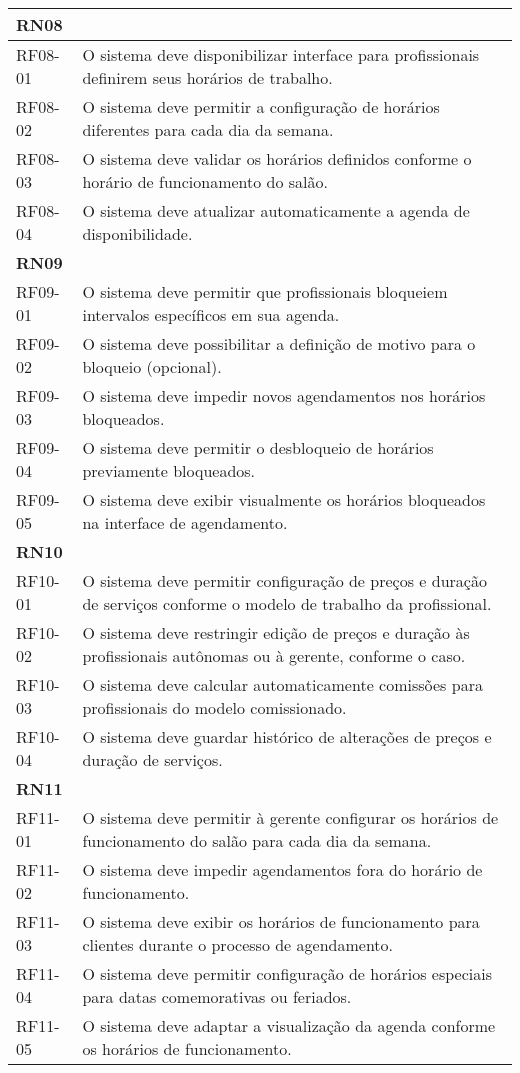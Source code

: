 \begin{longtable}{|p{}|p{}|}
	\multicolumn{2}{|l|}{\textbf{RN08}} \\ \hline
	RF08-01 & O sistema deve disponibilizar interface para profissionais definirem seus horários de trabalho. \\ \hline
	RF08-02 & O sistema deve permitir a configuração de horários diferentes para cada dia da semana. \\ \hline
	RF08-03 & O sistema deve validar os horários definidos conforme o horário de funcionamento do salão. \\ \hline
	RF08-04 & O sistema deve atualizar automaticamente a agenda de disponibilidade. \\ \hline
	
	\multicolumn{2}{|l|}{\textbf{RN09}} \\ \hline
	RF09-01 & O sistema deve permitir que profissionais bloqueiem intervalos específicos em sua agenda. \\ \hline
	RF09-02 & O sistema deve possibilitar a definição de motivo para o bloqueio (opcional). \\ \hline
	RF09-03 & O sistema deve impedir novos agendamentos nos horários bloqueados. \\ \hline
	RF09-04 & O sistema deve permitir o desbloqueio de horários previamente bloqueados. \\ \hline
	RF09-05 & O sistema deve exibir visualmente os horários bloqueados na interface de agendamento. \\ \hline
	
	\multicolumn{2}{|l|}{\textbf{RN10}} \\ \hline
	RF10-01 & O sistema deve permitir configuração de preços e duração de serviços conforme o modelo de trabalho da profissional. \\ \hline
	RF10-02 & O sistema deve restringir edição de preços e duração às profissionais autônomas ou à gerente, conforme o caso. \\ \hline
	RF10-03 & O sistema deve calcular automaticamente comissões para profissionais do modelo comissionado. \\ \hline
	RF10-04 & O sistema deve guardar histórico de alterações de preços e duração de serviços. \\ \hline
	
	\multicolumn{2}{|l|}{\textbf{RN11}} \\ \hline
	RF11-01 & O sistema deve permitir à gerente configurar os horários de funcionamento do salão para cada dia da semana. \\ \hline
	RF11-02 & O sistema deve impedir agendamentos fora do horário de funcionamento. \\ \hline
	RF11-03 & O sistema deve exibir os horários de funcionamento para clientes durante o processo de agendamento. \\ \hline
	RF11-04 & O sistema deve permitir configuração de horários especiais para datas comemorativas ou feriados. \\ \hline
	RF11-05 & O sistema deve adaptar a visualização da agenda conforme os horários de funcionamento. \\ \hline
	

\end{longtable}
